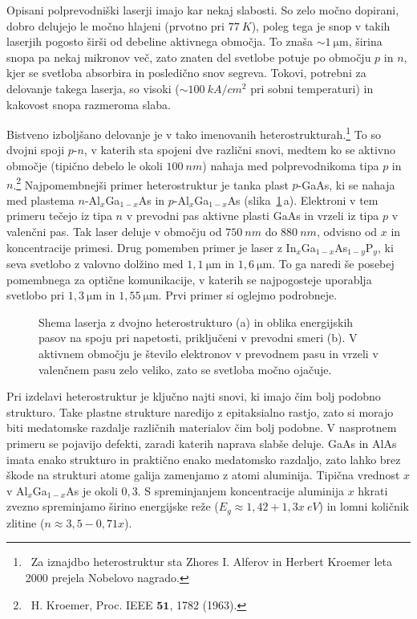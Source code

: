 Opisani polprevodniški laserji imajo kar nekaj slabosti. So zelo močno dopirani, 
dobro delujejo le močno hlajeni (prvotno pri $77~\si{K}$), poleg tega je snop 
v takih laserjih pogosto širši od debeline aktivnega območja. To znaša
$\sim 1~\si{\micro\meter}$, širina snopa pa nekaj mikronov več, zato
znaten del svetlobe potuje po območju $p$ in $n$, kjer se svetloba absorbira in posledično
snov segreva. Tokovi, potrebni za 
delovanje takega laserja, so visoki ($\sim 100~\si{kA}/\si{cm}^2$ pri sobni temperaturi) in
kakovost snopa razmeroma slaba. 

Bistveno izboljšano delovanje je v tako imenovanih 
heterostrukturah.\footnote{~Za 
iznajdbo heterostruktur sta Zhores I. Alferov in Herbert Kroemer leta 2000 prejela Nobelovo nagrado.}
 To so dvojni spoji $p$-$n$, 
v katerih sta spojeni dve različni snovi, medtem ko se aktivno območje (tipično debelo le okoli $100~\si{nm}$) 
nahaja med polprevodnikoma tipa $p$ in $n$.\footnote{~H. Kroemer, Proc. IEEE $\mathbf{51}$, 1782 (1963).}
Najpomembnejši primer heterostruktur je tanka plast $p$-GaAs, ki se nahaja med plastema  
$n$-Al$_x$Ga$_{1-x}$As in $p$-Al$_x$Ga$_{1-x}$As 
(slika~\ref{fig:hetero}\,a). Elektroni v tem primeru tečejo iz tipa $n$ v prevodni pas aktivne plasti
GaAs in vrzeli iz tipa $p$ v valenčni pas. 
Tak laser deluje v območju od $750~\si{nm}$ do $880~\si{nm}$, odvisno od $x$ in koncentracije primesi.
Drug pomemben primer je laser z In$_{x}$Ga$_{1-x}$As$_{1-y}$P$_y$, ki seva svetlobo z valovno 
dolžino med $1,1~\si{\micro\metre}$ in $1,6~\si{\micro\metre}$. To ga naredi še posebej pomembnega za optične
komunikacije, v katerih se najpogosteje uporablja svetlobo pri $1,3~\si{\micro\meter}$ in $1,55~\si{\micro\meter}$. 
Prvi primer si oglejmo podrobneje.
\begin{figure}[ht]
\centering
\def\svgwidth{145truemm} 

\caption{Shema laserja z dvojno heterostrukturo (a) in oblika energijskih pasov 
na spoju pri napetosti, priključeni v prevodni smeri (b). V aktivnem območju
je število elektronov v prevodnem pasu in vrzeli v valenčnem pasu zelo veliko, zato se 
svetloba močno ojačuje.
}
\label{fig:hetero}
\end{figure}
\begin{remark}
Pri izdelavi heterostruktur je ključno najti snovi, ki imajo čim bolj podobno strukturo.
Take plastne strukture naredijo z epitaksialno rastjo, zato si morajo biti medatomske
razdalje različnih materialov čim bolj podobne. V nasprotnem primeru se pojavijo 
defekti, zaradi katerih naprava slabše deluje. 
GaAs in AlAs imata enako strukturo in praktično enako medatomsko razdaljo, zato 
lahko brez škode na strukturi atome galija zamenjamo z atomi aluminija. Tipična
vrednost $x$ v Al$_x$Ga$_{1-x}$As je okoli $0,3$. S spreminjanjem koncentracije aluminija $x$ hkrati
zvezno spreminjamo širino energijske reže ($E_g \approx 1,42 + 1,3x~\si{eV}$) in lomni količnik 
zlitine ($n \approx 3,5-0,71x$).
\end{remark}

